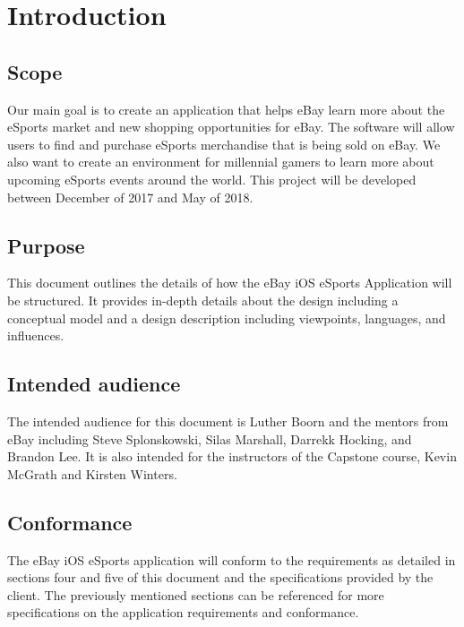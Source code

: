\documentclass[onecolumn, draftclsnofoot,10pt, compsoc]{IEEEtran}
\begin{document}
\newpage
{}
\tableofcontents
\clearpage


\section{Introduction}

\subsection{Scope}
Our main goal is to create an application that helps eBay learn more about the eSports market and new shopping opportunities for eBay. The software will allow users to find and purchase eSports merchandise that is being sold on eBay. We also want to create an environment for millennial gamers to learn more about upcoming eSports events around the world. This project will be developed between December of 2017 and May of 2018.

\subsection{Purpose}
This document outlines the details of how the eBay iOS eSports Application will be structured. It provides in-depth details about the design including a conceptual model and a design description including viewpoints, languages, and influences.

\subsection{Intended audience}
The intended audience for this document is Luther Boorn and the mentors from eBay including Steve Splonskowski, Silas Marshall, Darrekk Hocking, and Brandon Lee. It is also intended for the instructors of the Capstone course, Kevin McGrath and Kirsten Winters. 

\subsection{Conformance}
The eBay iOS eSports application will conform to the requirements as detailed in sections four and five of this document and the specifications provided by the client. The previously mentioned sections can be referenced for more specifications on the application requirements and conformance.
\end{document}
